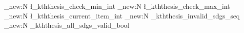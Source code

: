%

\makeatletter
\ExplSyntaxOn

\int_new:N \l_kththesis_check_min_int      %
\int_new:N \l_kththesis_check_max_int      %
\int_new:N \l_kththesis_current_item_int   %
\seq_new:N \g_kththesis_invalid_sdgs_seq    %
\bool_new:N \g_kththesis_all_sdgs_valid_bool %



